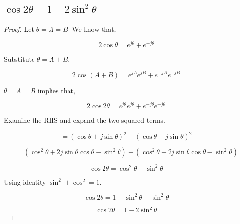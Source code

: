 \documentclass[12pt]{article}
\numberwithin{equation}{section}
\begin{document}
  \subsection{$\cos 2\theta = 1 - 2\sin^2 \theta$}

  \begin{proof}
    Let $ \theta = A = B. $ We know that,

    \begin{equation}
      2\cos \theta = e^{j\theta} + e^{-j\theta}
    \end{equation}

    Substitute $ \theta = A + B. $

    \begin{equation}
      2\cos(A + B) = e^{jA}e^{jB} + e^{-jA}e^{-jB}
    \end{equation}

    $ \theta = A = B $ implies that,

    \begin{equation}
      2\cos 2\theta = e^{j\theta}e^{j\theta} + e^{-j\theta}e^{-j\theta}
    \end{equation}

    \newpage

    Examine the RHS and expand the two squared terms.

    \begin{equation}
      =(\cos\theta + j\sin\theta)^2 + (\cos\theta - j\sin\theta)^2
    \end{equation}

    \begin{equation}
      =(\cos^2\theta + 2j\sin\theta\cos\theta - \sin^2\theta) + (\cos^2\theta - 2j\sin\theta\cos\theta - \sin^2\theta)
    \end{equation}

    \begin{equation}
      \cos2\theta = \cos^2\theta - \sin^2\theta
    \end{equation}

    Using identity $ \sin^2 + \cos^2 = 1. $

    \begin{equation}
      \cos2\theta = 1 - \sin^2\theta - \sin^2\theta
    \end{equation}

    \begin{equation}
      \cos2\theta = 1 - 2\sin^2\theta \tag*{\qedhere}
    \end{equation}
  \end{proof}
\end{document}

